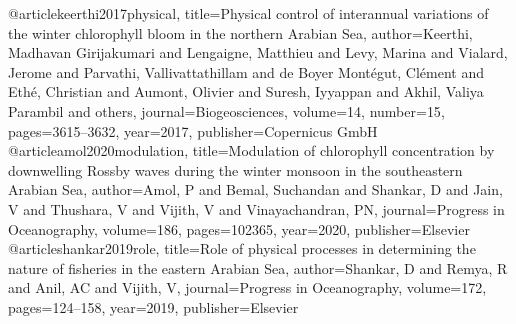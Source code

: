 @article{keerthi2017physical,
	title={Physical control of interannual variations of the winter chlorophyll bloom in the northern Arabian Sea},
	author={Keerthi, Madhavan Girijakumari and Lengaigne, Matthieu and Levy, Marina and Vialard, Jerome and Parvathi, Vallivattathillam and de Boyer Mont{\'e}gut, Cl{\'e}ment and Eth{\'e}, Christian and Aumont, Olivier and Suresh, Iyyappan and Akhil, Valiya Parambil and others},
	journal={Biogeosciences},
	volume={14},
	number={15},
	pages={3615--3632},
	year={2017},
	publisher={Copernicus GmbH}
}
@article{amol2020modulation,
	title={Modulation of chlorophyll concentration by downwelling Rossby waves during the winter monsoon in the southeastern Arabian Sea},
	author={Amol, P and Bemal, Suchandan and Shankar, D and Jain, V and Thushara, V and Vijith, V and Vinayachandran, PN},
	journal={Progress in Oceanography},
	volume={186},
	pages={102365},
	year={2020},
	publisher={Elsevier}
}
@article{shankar2019role,
	title={Role of physical processes in determining the nature of fisheries in the eastern Arabian Sea},
	author={Shankar, D and Remya, R and Anil, AC and Vijith, V},
	journal={Progress in Oceanography},
	volume={172},
	pages={124--158},
	year={2019},
	publisher={Elsevier}
}


